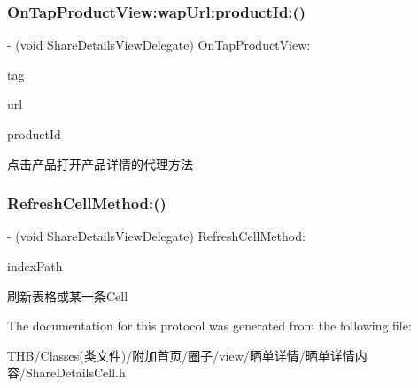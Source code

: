 \subsubsection{\texorpdfstring{On\+Tap\+Product\+View\+:wap\+Url\+:product\+Id\+:()}{OnTapProductView:wapUrl:productId:()}}
{\footnotesize\ttfamily -\/ (void Share\+Details\+View\+Delegate) On\+Tap\+Product\+View\+: \begin{DoxyParamCaption}\item[{(N\+S\+Integer)}]{tag }\item[{wapUrl:(N\+S\+String $\ast$)}]{url }\item[{productId:(N\+S\+String $\ast$)}]{product\+Id }\end{DoxyParamCaption}\hspace{0.3cm}{\ttfamily [optional]}}

点击产品打开产品详情的代理方法 \mbox{\label{protocol_share_details_view_delegate_01-p_ab394a1ad2942db4c92b991eaf7c994f3}} 
\subsubsection{\texorpdfstring{Refresh\+Cell\+Method\+:()}{RefreshCellMethod:()}}
{\footnotesize\ttfamily -\/ (void Share\+Details\+View\+Delegate) Refresh\+Cell\+Method\+: \begin{DoxyParamCaption}\item[{(long)}]{index\+Path }\end{DoxyParamCaption}\hspace{0.3cm}{\ttfamily [optional]}}

刷新表格或某一条\+Cell 

The documentation for this protocol was generated from the following file\+:\begin{DoxyCompactItemize}
\item 
T\+H\+B/\+Classes(类文件)/附加首页/圈子/view/晒单详情/晒单详情内容/Share\+Details\+Cell.\+h\end{DoxyCompactItemize}
